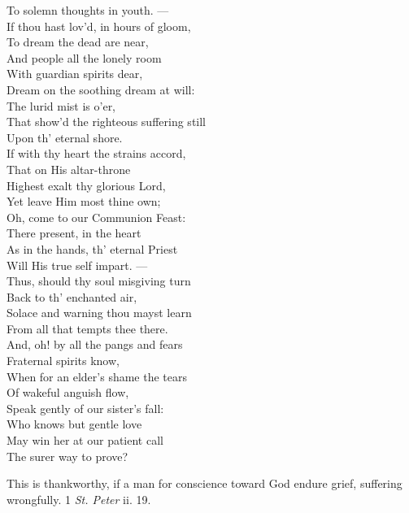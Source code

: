  To solemn thoughts in youth. — \\
  If thou hast lov’d, in hours of gloom, \\
 To dream the dead are near, \\
 And people all the lonely room \\
 With guardian spirits dear, \\
  Dream on the soothing dream at will: \\
 The lurid mist is o’er, \\
 That show’d the righteous suffering still \\
 Upon th’ eternal shore. \\
  If with thy heart the strains accord, \\
 That on His altar-throne \\
 Highest exalt thy glorious Lord, \\
 Yet leave Him most thine own; \\
  Oh, come to our Communion Feast: \\
 There present, in the heart \\
 As in the hands, th’ eternal Priest \\
 Will His true self impart. — \\
  Thus, should thy soul misgiving turn \\
 Back to th’ enchanted air, \\
 Solace and warning thou mayst learn \\
 From all that tempts thee there. \\
  And, oh! by all the pangs and fears \\
 Fraternal spirits know, \\
 When for an elder’s shame the tears \\
 Of wakeful anguish flow, \\
  Speak gently of our sister’s fall: \\
 Who knows but gentle love \\
 May win her at our patient call \\
 The surer way to prove?\\


This is thankworthy, if a man for conscience toward God endure grief, suffering wrongfully. 1 \emph{St. Peter} ii. 19.

